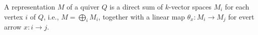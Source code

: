 A representation $M$ of a quiver $Q$ is a direct sum of $k$-vector spaces
$M_i$ for each vertex $i$ of $Q$, i.e., $M = \bigoplus_i M_i$, together with
a linear map $\theta_x\colon M_i\to M_j$ for evert arrow $x\colon i\to j$.
